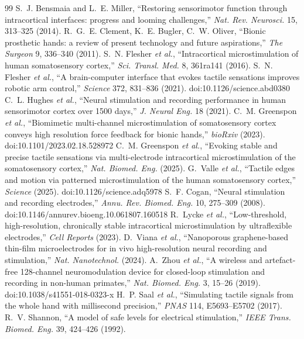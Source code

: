\documentclass[11pt]{article}
\begin{document}
\begin{thebibliography}{99}\setlength{\itemsep}{0pt}\small
{} S.~J. Bensmaia and L.~E. Miller, ``Restoring sensorimotor function through intracortical interfaces: progress and looming challenges,'' \emph{Nat. Rev. Neurosci.} 15, 313--325 (2014).
 R.~G.~E. Clement, K.~E. Bugler, C.~W. Oliver, ``Bionic prosthetic hands: a review of present technology and future aspirations,'' \emph{The Surgeon} 9, 336--340 (2011).
 S.~N. Flesher \emph{et al.}, ``Intracortical microstimulation of human somatosensory cortex,'' \emph{Sci. Transl. Med.} 8, 361ra141 (2016).
 S.~N. Flesher \emph{et al.}, ``A brain-computer interface that evokes tactile sensations improves robotic arm control,'' \emph{Science} 372, 831--836 (2021). doi:10.1126/science.abd0380
 C.~L. Hughes \emph{et al.}, ``Neural stimulation and recording performance in human sensorimotor cortex over 1500 days,'' \emph{J. Neural Eng.} 18 (2021).
 C.~M. Greenspon \emph{et al.}, ``Biomimetic multi-channel microstimulation of somatosensory cortex conveys high resolution force feedback for bionic hands,'' \emph{bioRxiv} (2023). doi:10.1101/2023.02.18.528972
 C.~M. Greenspon \emph{et al.}, ``Evoking stable and precise tactile sensations via multi-electrode intracortical microstimulation of the somatosensory cortex,'' \emph{Nat. Biomed. Eng.} (2025).
 G.~Valle \emph{et al.}, ``Tactile edges and motion via patterned microstimulation of the human somatosensory cortex,'' \emph{Science} (2025). doi:10.1126/science.adq5978
 S.~F. Cogan, ``Neural stimulation and recording electrodes,'' \emph{Annu. Rev. Biomed. Eng.} 10, 275--309 (2008). doi:10.1146/annurev.bioeng.10.061807.160518
 R.~Lycke \emph{et al.}, ``Low-threshold, high-resolution, chronically stable intracortical microstimulation by ultraflexible electrodes,'' \emph{Cell Reports} (2023).
 D.~Viana \emph{et al.}, ``Nanoporous graphene-based thin-film microelectrodes for in vivo high-resolution neural recording and stimulation,'' \emph{Nat. Nanotechnol.} (2024).
 A.~Zhou \emph{et al.}, ``A wireless and artefact-free 128-channel neuromodulation device for closed-loop stimulation and recording in non-human primates,'' \emph{Nat. Biomed. Eng.} 3, 15--26 (2019). doi:10.1038/s41551-018-0323-x
 H.~P. Saal \emph{et al.}, ``Simulating tactile signals from the whole hand with millisecond precision,'' \emph{PNAS} 114, E5693--E5702 (2017).
 R.~V. Shannon, ``A model of safe levels for electrical stimulation,'' \emph{IEEE Trans. Biomed. Eng.} 39, 424--426 (1992).
\end{thebibliography}
 
\end{document}
